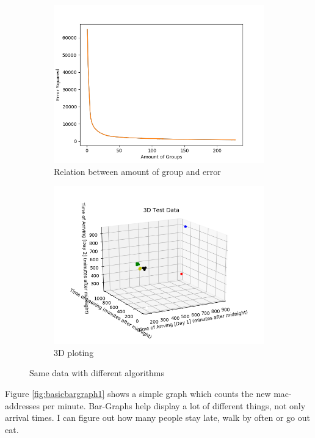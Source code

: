 \documentclass[paper=a4, fontsize=11pt]{article}
\begin{document}
\begin{figure}[H]
\begin{subfigure}[b]{0.2\linewidth}
  \includegraphics[width=\linewidth]{groupstoerror.png}
  \caption{Relation between amount of group and error}
  \label{fig:line1}
	\end{subfigure}
 \begin{subfigure}[b]{0.2\linewidth}
  \includegraphics[width=\linewidth]{3Dploting.png}
  \caption{3D ploting}
  \label{fig:3D1}
	\end{subfigure}
  \caption{Same data with different algorithms}
  \label{fig:PoCGraphs}
\end{figure}

Figure \ref{fig:basicbargraph1} shows a simple graph which counts the new mac-addresses per minute. Bar-Graphs help display a lot of different things, not only arrival times. I can figure out how many people stay late, walk by often or go out eat.
\end{document}
